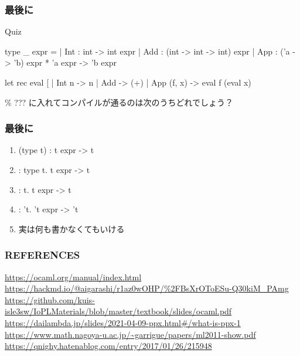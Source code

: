 \documentclass[dvipdfmx,14pt,notheorems,aspectratio=169]{beamer}
\theoremstyle{definition}
\begin{document}
    \begin{frame}[fragile]\frametitle{最後に}
        \begin{block}{Quiz}
            \scriptsize
        \begin{verbatimtab}
type _ expr =
| Int : int -> int expr
| Add : (int -> int -> int) expr
| App : ('a -> 'b) expr * 'a expr -> 'b expr

let rec eval [%
| Int n -> n
| Add -> (+)
| App (f, x) -> eval f (eval x)\end{verbatimtab}
        \end{block}
        \lbrack \% ??? \rbrack に入れてコンパイルが通るのは次のうちどれでしょう？
    \end{frame}

    \begin{frame}[fragile]\frametitle{最後に}
        \begin{enumerate}[1]
            \item (type t) : t expr -> t
            \item : type t. t expr -> t
            \item : t. t expr -> t
            \item : 't. 't expr -> 't
            \item 実は何も書かなくてもいける
        \end{enumerate}
    \end{frame}

    \begin{frame}[allowframebreaks]\frametitle{\foekfamily REFERENCES}
        
        
        \begin{thebibliography}{99}
        \beamertemplatetextbibitems
         \url{https://ocaml.org/manual/index.html}
         \url{https://hackmd.io/@aigarashi/r1az0wOHP/\%2FBsXrOToESu-Q30kiM_PAmg}
         \url{https://github.com/kuis-isle3sw/IoPLMaterials/blob/master/textbook/slides/ocaml.pdf}
         \url{https://dailambda.jp/slides/2021-04-09-ppx.html\#/what-is-ppx-1}
         \url{https://www.math.nagoya-u.ac.jp/~garrigue/papers/ml2011-show.pdf}
         \url{https://qnighy.hatenablog.com/entry/2017/01/26/215948}
        \end{thebibliography}
    \end{frame}
\end{document}
